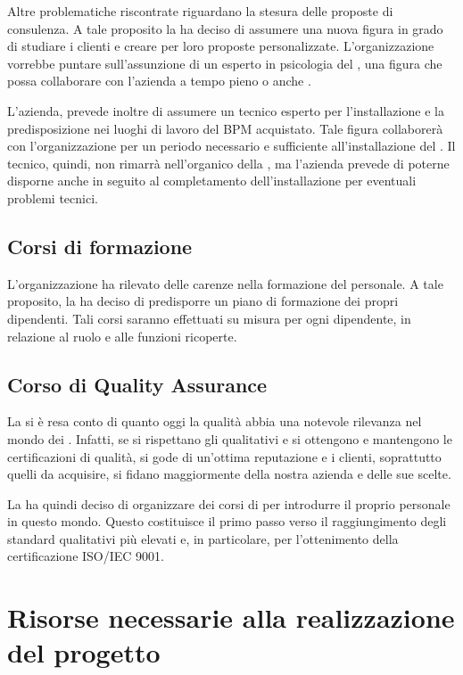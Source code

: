 Altre problematiche riscontrate riguardano la stesura delle proposte di consulenza. A tale proposito la \customer ha deciso di assumere una nuova figura in grado di studiare i clienti e creare per loro proposte personalizzate. L'organizzazione vorrebbe puntare sull'assunzione di un esperto in psicologia del \mktg , una figura che possa collaborare con l'azienda a tempo pieno o anche .

L'azienda, prevede inoltre di assumere un tecnico esperto per l'installazione e la predisposizione nei luoghi di lavoro del \sw BPM acquistato. Tale figura collaborerà con l'organizzazione per un periodo necessario e sufficiente all'installazione del \sw.
Il tecnico, quindi, non rimarrà nell'organico della \customer , ma l'azienda prevede di poterne disporne anche in seguito al completamento dell'installazione per eventuali problemi tecnici.


\subsection{Corsi di formazione} 
L'organizzazione ha rilevato delle carenze nella formazione del personale. A tale proposito, la \customer ha deciso di predisporre un piano di formazione dei propri dipendenti. Tali corsi saranno effettuati su misura per ogni dipendente, in relazione al ruolo e alle funzioni ricoperte. 


\subsection{Corso di Quality Assurance}
 La \customer si è resa conto di quanto oggi la qualità abbia una notevole rilevanza nel mondo dei . Infatti, se si rispettano gli  qualitativi e si ottengono e mantengono le certificazioni di qualità, si gode di un'ottima reputazione e i clienti, soprattutto quelli da acquisire, si fidano maggiormente della nostra azienda e delle sue scelte.

La \customer ha quindi deciso di organizzare dei corsi di  per introdurre il proprio personale in questo mondo. Questo costituisce il primo passo verso il raggiungimento degli standard qualitativi più elevati e, in particolare,  per l'ottenimento della certificazione ISO/IEC 9001.

\section{Risorse necessarie alla realizzazione del progetto}

